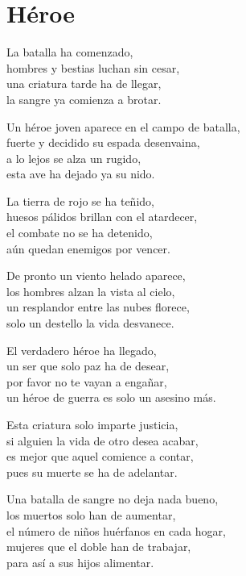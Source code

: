 \section*{Héroe}
\label{Heroe}

\vspace{1em}
\begin{center}
La batalla ha comenzado,\\ 
hombres y bestias luchan sin cesar,\\ 
una criatura tarde ha de llegar,\\ 
la sangre ya comienza a brotar.

\vspace{1em} 
Un héroe joven aparece en el campo de batalla,\\ 
fuerte y decidido su espada desenvaina,\\ 
a lo lejos se alza un rugido,\\ 
esta ave ha dejado ya su nido.

\vspace{1em} 
La tierra de rojo se ha teñido,\\ 
huesos pálidos brillan con el atardecer,\\ 
el combate no se ha detenido,\\ 
aún quedan enemigos por vencer.

\vspace{1em} 
De pronto un viento helado aparece,\\ 
los hombres alzan la vista al cielo,\\ 
un resplandor entre las nubes florece,\\ 
solo un destello la vida desvanece.

\vspace{1em} 
El verdadero héroe ha llegado,\\ 
un ser que solo paz ha de desear,\\ 
por favor no te vayan a engañar,\\ 
un héroe de guerra es solo un asesino más.

\vspace{1em} 
Esta criatura solo imparte justicia,\\ 
si alguien la vida de otro desea acabar,\\ 
es mejor que aquel comience a contar,\\ 
pues su muerte se ha de adelantar.

\vspace{1em} 
Una batalla de sangre no deja nada bueno,\\ 
los muertos solo han de aumentar,\\ 
el número de niños huérfanos en cada hogar,\\ 
mujeres que el doble han de trabajar,\\ 
para así a sus hijos alimentar.


\end{center}
